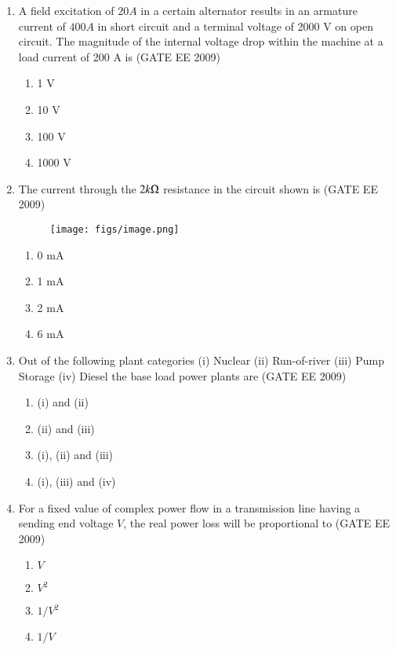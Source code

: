 \documentclass[journal,12pt,onecolumn]{IEEEtran}
\theoremstyle{remark}
\begin{document}
\begin{flushleft}
\begin{enumerate}
\item A field excitation of $20 A$ in a certain alternator results in an armature current of $400 A$ in short circuit and a terminal voltage of 2000 V on open circuit. The magnitude of the internal voltage drop within the machine at a load current of 200 A is 
\hfill(GATE EE 2009)
\begin{enumerate}
\item  1 V 
\item  10 V 
\item 100 V 
\item 1000 V
\end{enumerate}

\item The current through the $2 k \ohm$ resistance in the circuit shown is
\hfill(GATE EE 2009)
\begin{figure}[H]
    \centering
    \texttt{[image: figs/image.png]}
    \caption{}
    \label{fig:placeholder}
\end{figure}

\begin{enumerate}
    \item  0 mA  
\item  1 mA  
\item  2 mA  
\item  6 mA

\end{enumerate}

\item Out of the following plant categories 
(i) Nuclear  (ii) Run-of-river  (iii) Pump Storage  (iv) Diesel 
the base load power plants are 
\hfill(GATE EE 2009)
\begin{enumerate}
    \item  (i) and (ii) 
\item  (ii) and (iii) 
\item  (i), (ii) and (iii) 
\item  (i), (iii) and (iv)
\end{enumerate}

\item For a fixed value of complex power flow in a transmission line having a sending end voltage $V$, the real power loss will be proportional to 
\hfill(GATE EE 2009)
\begin{enumerate}
\item  $V$  
\item  $V^2$  
\item  $1/V^2$  
\item  $1/V$ 
\end{enumerate}



\end{enumerate}
\end{flushleft}
\end{document}
